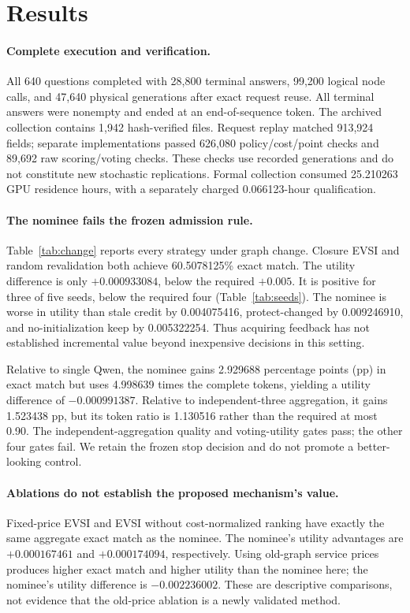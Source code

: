 \section{Results}
\label{sec:results}


\paragraph{Complete execution and verification.}
All 640 questions completed with 28,800 terminal answers, 99,200 logical
node calls, and 47,640 physical generations after exact request reuse.
All terminal answers were nonempty and ended at an end-of-sequence token.
The archived collection contains 1,942 hash-verified files. Request replay
matched 913,924 fields; separate implementations passed 626,080
policy/cost/point checks and 89,692 raw scoring/voting checks. These checks
use recorded generations and do not constitute new stochastic replications.
Formal collection consumed 25.210263 GPU residence hours, with a separately
charged 0.066123-hour qualification.

\paragraph{The nominee fails the frozen admission rule.}
Table~\ref{tab:change} reports every strategy under graph change.
Closure EVSI and random revalidation both achieve 60.5078125\% exact match.
The utility difference is only $+0.000933084$, below the required $+0.005$.
It is positive for three of five seeds, below the required four
(Table~\ref{tab:seeds}). The nominee is worse in utility than stale credit
by 0.004075416, protect-changed by 0.009246910, and no-initialization keep
by 0.005322254. Thus acquiring feedback has not established incremental
value beyond inexpensive decisions in this setting.

Relative to single Qwen, the nominee gains 2.929688 percentage points (pp)
in exact match but uses 4.998639 times the complete tokens, yielding a
utility difference of $-0.000991387$. Relative to independent-three
aggregation, it gains 1.523438 pp, but its token ratio is 1.130516 rather
than the required at most 0.90. The independent-aggregation quality and
voting-utility gates pass; the other four gates fail. We retain the frozen
stop decision and do not promote a better-looking control.

\paragraph{Ablations do not establish the proposed mechanism's value.}
Fixed-price EVSI and EVSI without cost-normalized ranking have exactly
the same aggregate exact match as the nominee. The nominee's utility
advantages are $+0.000167461$ and $+0.000174094$, respectively. Using
old-graph service prices produces higher exact match and higher utility
than the nominee here; the nominee's utility difference is
$-0.002236002$. These are descriptive comparisons, not evidence that
the old-price ablation is a newly validated method.

